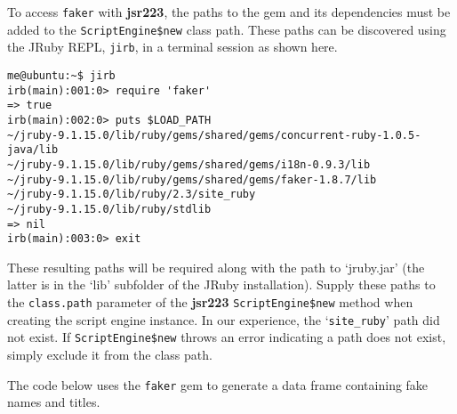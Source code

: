 \documentclass[
article,
11pt, %
a4paper, %
oneside, %
headinclude,footinclude, %
]{scrartcl}
\theoremstyle{definition} %
\theoremstyle{plain} %
\theoremstyle{remark} %
\newcommand{\pkg}[1]{\textbf{#1}}
\newcommand{\code}[1]{\texttt{#1}}
\newcommand{\file}[1]{{`\normalfont\textsf{#1}'}}
\newcommand{\samp}[1]{{`\normalfont\texttt{#1}'}}
\begin{document}
To access \code{faker} with \pkg{jsr223}, the paths to the gem and its dependencies must be added to the \code{ScriptEngine\$new} class path. These paths can be discovered using the JRuby REPL, \code{jirb}, in a terminal session as shown here.

\begin{verbatim}
me@ubuntu:~$ jirb
irb(main):001:0> require 'faker'
=> true
irb(main):002:0> puts $LOAD_PATH
~/jruby-9.1.15.0/lib/ruby/gems/shared/gems/concurrent-ruby-1.0.5-java/lib
~/jruby-9.1.15.0/lib/ruby/gems/shared/gems/i18n-0.9.3/lib
~/jruby-9.1.15.0/lib/ruby/gems/shared/gems/faker-1.8.7/lib
~/jruby-9.1.15.0/lib/ruby/2.3/site_ruby
~/jruby-9.1.15.0/lib/ruby/stdlib
=> nil
irb(main):003:0> exit
\end{verbatim}

These resulting paths will be required along with the path to \file{jruby.jar} (the latter is in the \file{lib} subfolder of the JRuby installation). Supply these paths to the \code{class.path} parameter of the \pkg{jsr223} \code{ScriptEngine\$new} method when creating the script engine instance. In our experience, the \samp{site\_ruby} path did not exist. If \code{ScriptEngine\$new} throws an error indicating a path does not exist, simply exclude it from the class path.

The code below uses the \code{faker} gem to generate a data frame containing fake names and titles.
\end{document}
